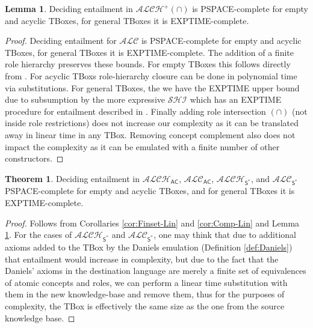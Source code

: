 \documentclass[letterpaper]{article} %
\theoremstyle{definition}
\newtheorem{lemma}{Lemma}
\theoremstyle{definition}
\theoremstyle{definition}
\newtheorem{theorem}{Theorem}
\theoremstyle{definition}
\theoremstyle{definition}
\begin{document}
\begin{lemma}\label{lem:DL-complexity}
    Deciding entailment in $\mathcal{ALCH^+(\cap)}$ is \textsf{PSPACE}-complete for empty and acyclic TBoxes, for general TBoxes it is \textsf{EXPTIME}-complete. 
\end{lemma}
\begin{proof}
    Deciding entailment for $\mathcal{ALC}$ is \textsf{PSPACE}-complete for empty and acyclic TBoxes, for general TBoxes it is \textsf{EXPTIME}-complete. The addition of a finite role hierarchy preserves these bounds. For empty TBoxes this follows directly from \cite[Theorem 1]{SahooThirunarayan2009ALCH}. For acyclic TBoxs role-hierarchy closure can be done in polynomial time via substitutions. For general TBoxes, the we have the \textsf{EXPTIME} upper bound due to subsumption by the more expressive $\mathcal{SHI}$ which has an \textsf{EXPTIME} procedure for entailment described in \cite{DBLP:journals/corr/abs-1106-2305}. Finally adding role intersection $(\cap)$ (not inside role restrictions) does not increase our complexity as it can be translated away in linear time in any TBox. Removing concept complement also does not impact the complexity as it can be emulated with a finite number of other constructors. 
\end{proof}


\begin{theorem}
    Deciding entailment in $\mathcal{ALCH}_\mathsf{AC}$,  $\mathcal{ALC}_\mathsf{AC}$, $\mathcal{ALCH}_\mathsf{S^*}$, and $\mathcal{ALC}_\mathsf{S^*}$ \textsf{PSPACE}-complete for empty and acyclic TBoxes, and for general TBoxes it is \textsf{EXPTIME}-complete.
\end{theorem}
\begin{proof}
    Follows from Corollaries \ref{cor:Finset-Lin} and \ref{cor:Comp-Lin} and Lemma \ref{lem:DL-complexity}. For the cases of $\mathcal{ALCH}_\mathsf{S^*}$ and $\mathcal{ALC}_\mathsf{S^*}$, one may think that due to additional axioms added to the TBox by the Daniels emulation (Definition \ref{def:Daniels}) that entailment would increase in complexity, but due to the fact that the Daniels' axioms in the destination language are merely a finite set of equivalences of atomic concepts and roles, we can perform a linear time substitution with them in the new knowledge-base and remove them, thus for the purposes of complexity, the TBox is effectively the same size as the one from the source knowledge base.    
\end{proof}

\noindent 
\end{document}
